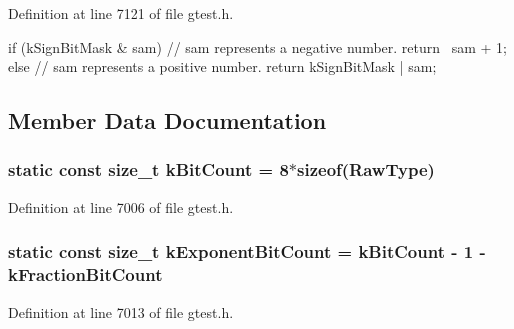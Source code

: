 \-Definition at line 7121 of file gtest.\-h.


\begin{DoxyCode}
                                                        {
    if (kSignBitMask & sam) {
      // sam represents a negative number.
      return ~sam + 1;
    } else {
      // sam represents a positive number.
      return kSignBitMask | sam;
    }
  }
\end{DoxyCode}


\subsection{\-Member \-Data \-Documentation}
\hypertarget{classtesting_1_1internal_1_1FloatingPoint_a23318ca13c0ee3362d724350d0eb9305}{
\subsubsection[{k\-Bit\-Count}]{\setlength{\rightskip}{0pt plus 5cm}static const size\-\_\-t {\bf k\-Bit\-Count} = 8$\ast$sizeof(\-Raw\-Type)}}\label{dd/d0f/classtesting_1_1internal_1_1FloatingPoint_a23318ca13c0ee3362d724350d0eb9305}


\-Definition at line 7006 of file gtest.\-h.

\hypertarget{classtesting_1_1internal_1_1FloatingPoint_a4d1e882cf5e945481f6ff9637e897f2c}{
\subsubsection[{k\-Exponent\-Bit\-Count}]{\setlength{\rightskip}{0pt plus 5cm}static const size\-\_\-t {\bf k\-Exponent\-Bit\-Count} = {\bf k\-Bit\-Count} -\/ 1 -\/ {\bf k\-Fraction\-Bit\-Count}}}\label{dd/d0f/classtesting_1_1internal_1_1FloatingPoint_a4d1e882cf5e945481f6ff9637e897f2c}


\-Definition at line 7013 of file gtest.\-h.


